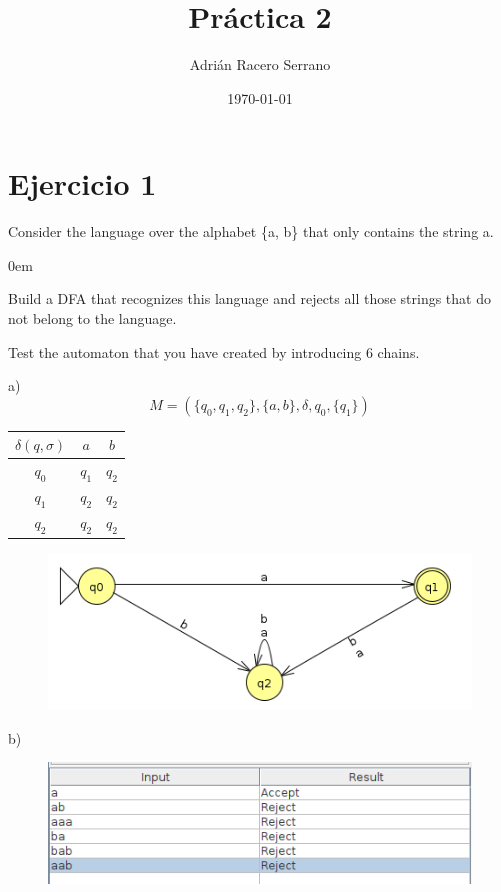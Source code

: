 \documentclass[11pt]{article}
\title{\textbf{Práctica 2}}
\author{Adrián Racero Serrano}
\date{\today}
\begin{document}
\maketitle
\thispagestyle{empty}

\section*{Ejercicio 1}
Consider the language over the alphabet \{a, b\} that only contains the string a.
\begin{description}
\addtolength{\itemindent}{0.80cm}
\itemsep0em 
\item[a.] Build a DFA that recognizes this language and rejects all those strings that do not belong to the language.
\item[b.] Test the automaton that you have created by introducing 6 chains.
\end{description}
\begin{flushleft}\end{flushleft}
a)
\begin{equation*}
M = (\{q_{0},q_{1},q_{2}\}, 
\{a,b\}, \delta, q_0, \{q_1\})
\end{equation*}

\begin{table}[h!]
\begin{tabular}{c|c|c}
  $\delta(q,\sigma)$ & $a$ & $b$\\
  \hline
  $q_0$& $q_1$ & $q_2$\\
  \hline
  $q_1$& $q_2$ & $q_2$\\
  \hline
  $q_2$& $q_2$ & $q_2$
\end{tabular}
\end{table}

\begin{figure}[htp]
\centering
\includegraphics[scale=0.60]{only-a.png}
\label{}
\end{figure}

\newpage

\begin{flushleft}\end{flushleft}
b)
\begin{figure}[htp]
\centering
\includegraphics[scale=0.60]{test-only-a.png}
\label{}
\end{figure}
\end{document}
